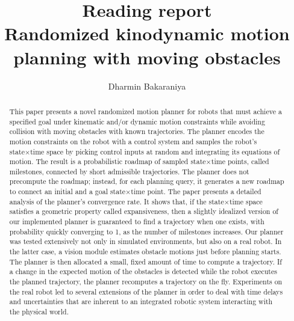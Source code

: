 \documentclass[12pt]{article}
\title{Reading report\\Randomized kinodynamic motion planning with moving obstacles\cite{hsu2002randomized}}
\author{Dharmin Bakaraniya}
\begin{document}
\maketitle{}

\begin{abstract}
This paper presents a novel randomized motion planner for robots
that must achieve a specified goal under kinematic and/or dynamic
motion constraints while avoiding collision with moving obstacles
with known trajectories. The planner encodes the motion constraints
on the robot with a control system and samples the robot’s state×time
space by picking control inputs at random and integrating its equations of motion. The result is a probabilistic roadmap of sampled
state×time points, called milestones, connected by short admissible trajectories. The planner does not precompute the roadmap;
instead, for each planning query, it generates a new roadmap to
connect an initial and a goal state×time point. The paper presents a
detailed analysis of the planner’s convergence rate. It shows that, if
the state×time space satisfies a geometric property called expansiveness, then a slightly idealized version of our implemented planner
is guaranteed to find a trajectory when one exists, with probability
quickly converging to 1, as the number of milestones increases. Our
planner was tested extensively not only in simulated environments,
but also on a real robot. In the latter case, a vision module estimates
obstacle motions just before planning starts. The planner is then
allocated a small, fixed amount of time to compute a trajectory. If
a change in the expected motion of the obstacles is detected while
the robot executes the planned trajectory, the planner recomputes
a trajectory on the fly. Experiments on the real robot led to several
extensions of the planner in order to deal with time delays and uncertainties that are inherent to an integrated robotic system interacting
with the physical world.
\end{abstract}
\end{document}
